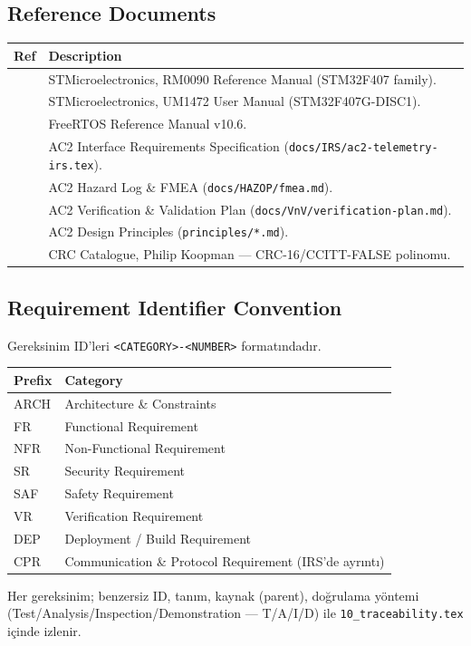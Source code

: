 \subsection{Reference Documents}
\begin{tabularx}{\textwidth}{|l|X|}
\hline
\textbf{Ref} & \textbf{Description} \\
\hline
[R1] & STMicroelectronics, RM0090 Reference Manual (STM32F407 family). \\
\hline
[R2] & STMicroelectronics, UM1472 User Manual (STM32F407G-DISC1). \\
\hline
[R3] & FreeRTOS Reference Manual v10.6. \\
\hline
[R4] & AC2 Interface Requirements Specification (\texttt{docs/IRS/ac2-telemetry-irs.tex}). \\
\hline
[R5] & AC2 Hazard Log \& FMEA (\texttt{docs/HAZOP/fmea.md}). \\
\hline
[R6] & AC2 Verification \& Validation Plan (\texttt{docs/VnV/verification-plan.md}). \\
\hline
[R7] & AC2 Design Principles (\texttt{principles/*.md}). \\
\hline
[R8] & CRC Catalogue, Philip Koopman — CRC-16/CCITT-FALSE polinomu. \\
\hline
\end{tabularx}

\subsection{Requirement Identifier Convention}
Gereksinim ID'leri \texttt{<CATEGORY>-<NUMBER>} formatındadır.

\begin{tabularx}{\textwidth}{|l|X|}
\hline
\textbf{Prefix} & \textbf{Category} \\
\hline
ARCH & Architecture \& Constraints \\
FR   & Functional Requirement \\
NFR  & Non-Functional Requirement \\
SR   & Security Requirement \\
SAF  & Safety Requirement \\
VR   & Verification Requirement \\
DEP  & Deployment / Build Requirement \\
CPR  & Communication \& Protocol Requirement (IRS'de ayrıntı) \\
\hline
\end{tabularx}

\noindent Her gereksinim; benzersiz ID, tanım, kaynak (parent), doğrulama yöntemi (Test/Analysis/Inspection/Demonstration — T/A/I/D) ile \texttt{10\_traceability.tex} içinde izlenir.
